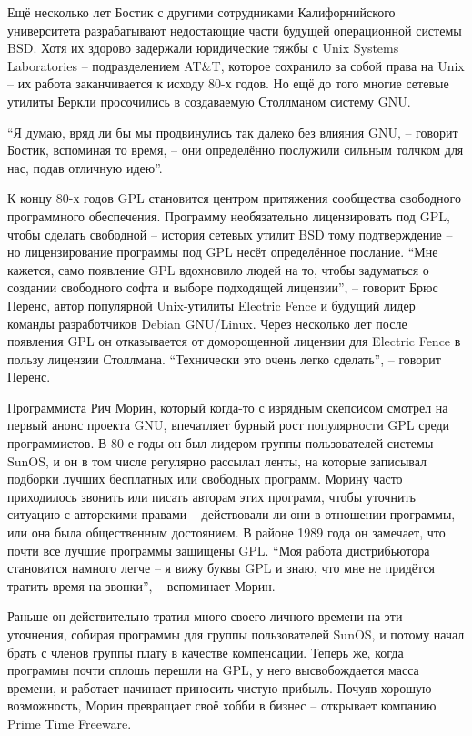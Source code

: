 Ещё несколько лет Бостик с другими сотрудниками Калифорнийского университета разрабатывают недостающие части будущей операционной системы BSD. Хотя их здорово задержали юридические тяжбы с Unix Systems Laboratories -- подразделением AT\&T, которое сохранило за собой права на Unix -- их работа заканчивается к исходу 80-х годов. Но ещё до того многие сетевые утилиты Беркли просочились в создаваемую Столлманом систему GNU.

\enquote{Я думаю, вряд ли бы мы продвинулись так далеко без влияния GNU, -- говорит Бостик, вспоминая то время, -- они определённо послужили сильным толчком для нас, подав отличную идею}.

К концу 80-х годов GPL становится центром притяжения сообщества свободного программного обеспечения. Программу необязательно лицензировать под GPL, чтобы сделать свободной -- история сетевых утилит BSD тому подтверждение -- но лицензирование программы под GPL несёт определённое послание. \enquote{Мне кажется, само появление GPL вдохновило людей на то, чтобы задуматься о создании свободного софта и выборе подходящей лицензии}, -- говорит Брюс Перенс, автор популярной Unix-утилиты Electric Fence и будущий лидер команды разработчиков Debian GNU/Linux. Через несколько лет после появления GPL он отказывается от доморощенной лицензии для Electric Fence в пользу лицензии Столлмана. \enquote{Технически это очень легко сделать}, -- говорит Перенс.

Программиста Рич Морин, который когда-то с изрядным скепсисом смотрел на первый анонс проекта GNU, впечатляет бурный рост популярности GPL среди программистов. В 80-е годы он был лидером группы пользователей системы SunOS, и он в том числе регулярно рассылал ленты, на которые записывал подборки лучших бесплатных или свободных программ. Морину часто приходилось звонить или писать авторам этих программ, чтобы уточнить ситуацию с авторскими правами -- действовали ли они в отношении программы, или она была общественным достоянием. В районе 1989 года он замечает, что почти все лучшие программы защищены GPL. \enquote{Моя работа дистрибьютора становится намного легче -- я вижу буквы GPL и знаю, что мне не придётся тратить время на звонки}, -- вспоминает Морин.

Раньше он действительно тратил много своего личного времени на эти уточнения, собирая программы для группы пользователей SunOS, и потому начал брать с членов группы плату в качестве компенсации. Теперь же, когда программы почти сплошь перешли на GPL, у него высвобождается масса времени, и работает начинает приносить чистую прибыль. Почуяв хорошую возможность, Морин превращает своё хобби в бизнес -- открывает компанию Prime Time Freeware.

